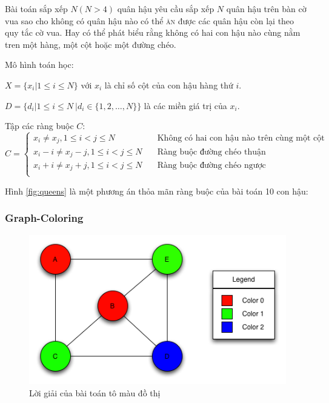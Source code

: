 Bài toán sắp xếp $N ( N > 4)$ quân hậu yêu cầu sắp xếp $N$ quân hậu trên bàn cờ vua sao cho không có quân hậu nào có thể \textsc{ăn} được các quân hậu còn lại theo quy tắc cờ vua. Hay có thể phát biểu rằng không có hai con hậu nào cùng nằm tren một hàng, một cột hoặc một đường chéo.

Mô hình toán học:
\begin{list}{•}{}
	\item $X = \{x_i | 1 \le i \le N \}$ \quad với $x_i$ là chỉ số cột của con hậu hàng thứ $i$.
	\item $D = \{d_i | 1 \le i \le N \ | d_i \in \{1,2,\dots,N\}\}$ \quad là các miền giá trị của $x_i$.
	\item Tập các ràng buộc $C$:
	\[ C =
  		\begin{cases}
    		x_i \neq x_j, 1 \leq i < j \leq N       	 & \quad \text{Không có hai con hậu nào trên cùng một cột}\\
    		x_i - i \neq x_j - j, 1 \leq i < j \leq N  & \quad \text{Ràng buộc đường chéo thuận}\\		
    		x_i + i \neq x_j + j, 1 \leq i < j \leq N  & \quad \text{Ràng buộc đường chéo ngược}\\
  		\end{cases}
	\]
\end{list}

Hình \ref{fig:queens} là một phương án thỏa mãn ràng buộc của bài toán 10 con hậu:
\subsubsection*{Graph-Coloring}

\begin{figure}
	\centering
	\includegraphics[scale=1]{figures/graph-sol.png}
	\caption{Lời giải của bài toán tô màu đồ thị\label{fig:graphSol}}
\end{figure}

